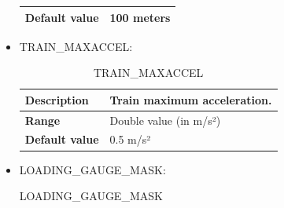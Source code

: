 \documentclass{template/openetcs}
\begin{document}
\begin{itemize}
\begin{longtable}{|l|l|}
				\hline
				
					\begin{minipage}[t]{0.22\linewidth} \textbf{Default value}	\end{minipage} 
				&	\begin{minipage}[t]{0.78\linewidth} 100 meters \end{minipage} \\
				
				\hline
				
			\end{longtable}
			
		\item TRAIN\_MAXACCEL:
																											
			\begin{longtable}{|l|l|}
				\caption{TRAIN\_MAXACCEL}\\ 
				\hline
				
					\begin{minipage}[t]{0.22\linewidth} \textbf{Description}	\end{minipage} 
				&	\begin{minipage}[t]{0.78\linewidth} Train maximum acceleration. \end{minipage} \\
				
				\hline
																																									
					\begin{minipage}[t]{0.22\linewidth} \textbf{Range}	\end{minipage} 
				&	\begin{minipage}[t]{0.78\linewidth} Double value (in m/s²) \end{minipage} \\
				
				\hline
				
					\begin{minipage}[t]{0.22\linewidth} \textbf{Default value}	\end{minipage} 
				&	\begin{minipage}[t]{0.78\linewidth} 0.5 m/s² \end{minipage} \\
				
				\hline
				
			\end{longtable}
			
		\item LOADING\_GAUGE\_MASK:
																													
			\begin{longtable}{|l|l|}
				\caption{LOADING\_GAUGE\_MASK}\\ 
				\hline
				

\end{longtable}
\end{itemize}
\end{document}
